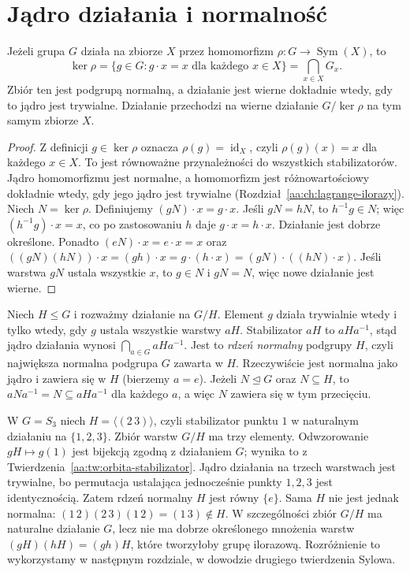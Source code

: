 \section{Jądro działania i normalność}
\begin{twierdzenie}
\label{aa:tw:jadro-akcji}
Jeżeli grupa $G$ działa na zbiorze $X$ przez homomorfizm
$\rho:G\to\operatorname{Sym}(X)$, to
\[
 \ker\rho=\{g\in G:g\cdot x=x\text{ dla każdego }x\in X\}
 =\bigcap_{x\in X}G_x.
\]
Zbiór ten jest podgrupą normalną, a działanie jest wierne
dokładnie wtedy, gdy to jądro jest trywialne.
Działanie przechodzi na wierne działanie $G/\ker\rho$
na tym samym zbiorze $X$.
\end{twierdzenie}
\begin{proof}
Z definicji $g\in\ker\rho$ oznacza
$\rho(g)=\operatorname{id}_X$, czyli
$\rho(g)(x)=x$ dla każdego $x\in X$.
To jest równoważne przynależności do wszystkich stabilizatorów.
Jądro homomorfizmu jest normalne, a homomorfizm jest
różnowartościowy dokładnie wtedy, gdy jego jądro jest trywialne
(Rozdział~\ref{aa:ch:lagrange-ilorazy}).
Niech $N=\ker\rho$. Definiujemy
$(gN)\cdot x=g\cdot x$.
Jeśli $gN=hN$, to $h^{-1}g\in N$;
więc $(h^{-1}g)\cdot x=x$, co po zastosowaniu $h$
daje $g\cdot x=h\cdot x$. Działanie jest dobrze określone. Ponadto
$(eN)\cdot x=e\cdot x=x$ oraz
$((gN)(hN))\cdot x=(gh)\cdot x
=g\cdot(h\cdot x)=(gN)\cdot((hN)\cdot x)$.
Jeśli warstwa $gN$ ustala wszystkie $x$, to $g\in N$
i $gN=N$, więc nowe działanie jest wierne.
\end{proof}

\begin{przyklad}
Niech $H\le G$ i rozważmy działanie na $G/H$.
Element $g$ działa trywialnie wtedy i tylko wtedy, gdy
$g$ ustala wszystkie warstwy $aH$.
Stabilizator $aH$ to $aHa^{-1}$, stąd jądro działania
wynosi $\bigcap_{a\in G}aHa^{-1}$.
Jest to \emph{rdzeń normalny} podgrupy $H$, czyli
największa normalna podgrupa $G$ zawarta w $H$.
Rzeczywiście jest normalna jako jądro i zawiera się
w $H$ (bierzemy $a=e$).
Jeżeli $N\trianglelefteq G$ oraz $N\subseteq H$, to
$aNa^{-1}=N\subseteq aHa^{-1}$ dla każdego $a$,
a więc $N$ zawiera się w tym przecięciu.
\end{przyklad}

\begin{przyklad}
\label{aa:prz:s3-core}
W $G=S_3$ niech $H=\langle(2\,3)\rangle$, czyli
stabilizator punktu $1$ w naturalnym działaniu na
$\{1,2,3\}$. Zbiór warstw $G/H$ ma trzy elementy.
Odwzorowanie $gH\mapsto g(1)$ jest bijekcją zgodną
z działaniem $G$; wynika to z Twierdzenia~\ref{aa:tw:orbita-stabilizator}.
Jądro działania na trzech warstwach jest trywialne, bo
permutacja ustalająca jednocześnie punkty $1,2,3$
jest identycznością. Zatem rdzeń normalny $H$ jest
równy $\{e\}$. Sama $H$ nie jest jednak normalna:
$(1\,2)(2\,3)(1\,2)=(1\,3)\notin H$.
W szczególności zbiór $G/H$ ma naturalne działanie $G$,
lecz nie ma dobrze określonego mnożenia warstw
$(gH)(hH)=(gh)H$, które tworzyłoby grupę ilorazową.
Rozróżnienie to wykorzystamy w następnym rozdziale,
w dowodzie drugiego twierdzenia Sylowa.
\end{przyklad}

